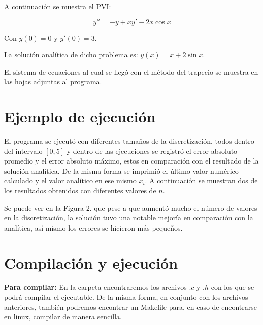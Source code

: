 \documentclass[12pt]{article}
\begin{document}
A continuación se muestra el PVI:

$$y'' = -y + xy' - 2x \cos x$$

Con $y(0) = 0$ y $y'(0) = 3$.

La solución analítica de dicho problema es: $y(x) = x + 2 \sin x$.

El sistema de ecuaciones al cual se llegó con el método del trapecio se muestra en las hojas adjuntas al programa.

\section{Ejemplo de ejecución}
El programa se ejecutó con diferentes tamaños de la discretización, todos dentro del intervalo $[0, 5]$ y dentro de las ejecuciones se registró el error absoluto promedio y el error absoluto máximo, estos en comparación con el resultado de la solución analítica. De la misma forma se imprimió el último valor numérico calculado y el valor analítico en ese mismo $x_i$. A continuación se muestran dos de los resultados obtenidos con diferentes valores de $n$.

\begin{figure}[H]
	\centering
	\hfill
\end{figure}

\begin{figure}[H]
	\centering
	\hfill
\end{figure}

Se puede ver en la Figura 2. que pese a que aumentó mucho el número de valores en la discretización, la solución tuvo una notable mejoría en comparación con la analítica, así mismo los errores se hicieron más pequeños.

\section{Compilación y ejecución}
\textbf{Para compilar:} En la carpeta encontraremos los archivos $.c$ y $.h$ con los que se podrá compilar el ejecutable. De la misma forma, en conjunto con los archivos anteriores, también podremos encontrar un Makefile para, en caso de encontrarse en linux, compilar de manera sencilla.
\end{document}
